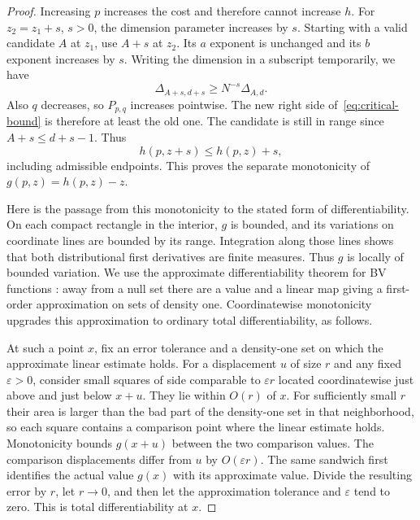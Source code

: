 \begin{proof}
Increasing $p$ increases the cost and therefore cannot increase $h$.
For $z_2=z_1+s$, $s>0$, the dimension parameter increases by $s$.
Starting with a valid candidate $A$ at $z_1$, use $A+s$ at $z_2$.
Its $a$ exponent is unchanged and its $b$ exponent increases by $s$.
Writing the dimension in a subscript temporarily, we have
\[
 \Delta_{A+s,d+s}\ge N^{-s}\Delta_{A,d}.
\]
Also $q$ decreases, so $P_{p,q}$ increases pointwise.  The new right side
of~\eqref{eq:critical-bound} is therefore at least the old one.
The candidate is still in range since $A+s\le d+s-1$.  Thus
\begin{equation}\label{eq:critical-z-monotonicity}
 h(p,z+s)\le h(p,z)+s,
\end{equation}
including admissible endpoints.  This proves the separate monotonicity of
$g(p,z)=h(p,z)-z$.

Here is the passage from this monotonicity to the stated form of
differentiability.  On each compact rectangle in the interior, $g$ is
bounded, and its variations on coordinate lines are bounded by its range.
Integration along those lines shows that both distributional first
derivatives are finite measures.  Thus $g$ is locally of bounded variation.
We use the approximate differentiability theorem for BV functions
\citep[Theorem~3.83]{AFP2000}:
away from a null set there are a value and a linear map giving a first-order
approximation on sets of density one.  Coordinatewise monotonicity upgrades
this approximation to ordinary total differentiability, as follows.

At such a point $x$, fix an error tolerance and a density-one set on which
the approximate linear estimate holds.  For a displacement $u$ of size $r$
and any fixed $\varepsilon>0$, consider small squares of side comparable to
$\varepsilon r$ located coordinatewise just above and just below $x+u$.
They lie within $O(r)$ of $x$.  For sufficiently small $r$ their area is
larger than the bad part of the density-one set in that neighborhood, so
each square contains a comparison point where the linear estimate holds.
Monotonicity bounds $g(x+u)$ between the two comparison values.  The
comparison displacements differ from $u$ by $O(\varepsilon r)$.
The same sandwich first identifies the actual value $g(x)$ with its
approximate value.  Divide the resulting error by $r$, let $r\to0$, and
then let the approximation tolerance and $\varepsilon$ tend to zero.
This is total differentiability at $x$.


\end{proof}
